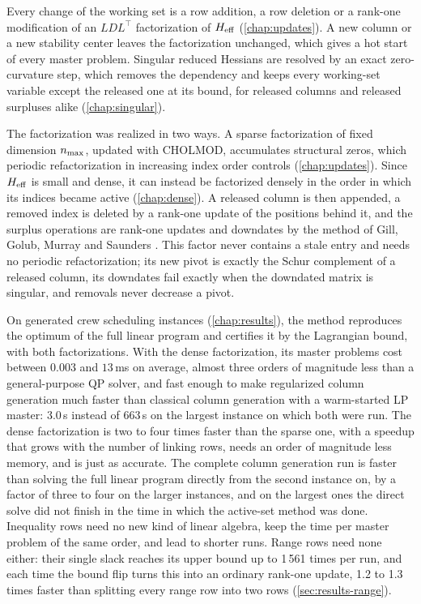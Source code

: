 \medskip

Every change of the working set is a row addition, a row deletion or a rank-one modification
of an $LDL^\top$ factorization of $H_{\mathrm{eff}}$ (\cref{chap:updates}). A new column or a new
stability center leaves the factorization unchanged, which gives a hot start of every master
problem. Singular reduced Hessians are resolved by an exact zero-curvature step, which removes
the dependency and keeps every working-set variable except the released one at its bound, for
released columns and released surpluses alike (\cref{chap:singular}).

\medskip

The factorization was realized in two ways. A sparse factorization of fixed dimension
$n_{\max}$, updated with CHOLMOD, accumulates structural zeros, which periodic refactorization in
increasing index order controls (\cref{chap:updates}). Since $H_{\mathrm{eff}}$ is small and dense, it can
instead be factorized densely in the order in which its indices became active
(\cref{chap:dense}). A released column is then appended, a removed index is deleted by a
rank-one update of the positions behind it, and the surplus operations are rank-one updates
and downdates by the method of Gill, Golub, Murray and Saunders \cite{gill1974methods}. This factor never contains a
stale entry and needs no periodic refactorization; its new pivot is exactly the Schur
complement of a released column, its downdates fail exactly when the downdated matrix is
singular, and removals never decrease a pivot.

\medskip

On generated crew scheduling instances (\cref{chap:results}), the method reproduces the optimum
of the full linear program and certifies it by the Lagrangian bound, with both factorizations.
With the dense factorization, its master problems cost between $0.003$ and $13$\,ms on
average, almost three orders of magnitude less than a general-purpose QP solver, and fast
enough to make regularized column generation much faster than classical column generation with
a warm-started LP master: 3.0\,s instead of 663\,s on the largest instance on which both were
run. The dense factorization is two to four times faster than the sparse one, with a speedup
that grows with the number of linking rows, needs an order of magnitude less memory, and is
just as accurate. The complete column generation run is faster than solving the full linear
program directly from the second instance on, by a factor of three to four on the larger
instances, and on the largest ones the direct solve did not finish in the time in which the
active-set method was done. Inequality rows need no new kind of linear algebra, keep the time
per master problem of the same order, and lead to shorter runs. Range rows need none either:
their single slack reaches its upper bound up to 1\,561 times per run, and each time the bound
flip turns this into an ordinary rank-one update, 1.2 to 1.3 times faster than splitting
every range row into two rows (\cref{sec:results-range}).

